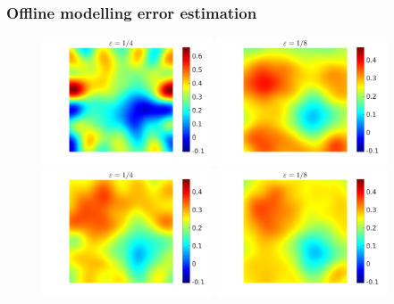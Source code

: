 \begin{frame}
\frametitle{Offline modelling error estimation}
\begin{figure}[t]
\centering
\includegraphics[width = 0.45\textwidth]{Images/ensemble_500_e4}
\includegraphics[width = 0.45\textwidth]{Images/ensemble_500_e8}
\\
\includegraphics[width = 0.45\textwidth]{Images/ensemble_500_e4_model_error}
\includegraphics[width = 0.45\textwidth]{Images/ensemble_500_e8_model_error}
\end{figure}
\end{frame}

